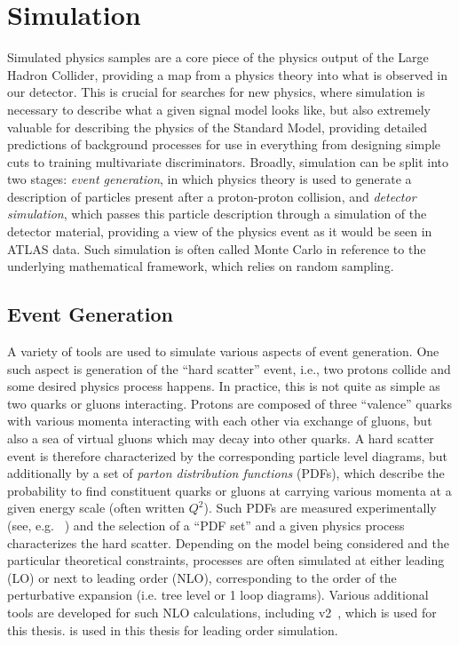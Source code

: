 \chapter{Simulation}
\label{chap:simulation}

Simulated physics samples are a core piece of the physics output of the Large Hadron Collider, 
providing a map from a physics theory into what is observed in our detector. This is crucial for 
searches for new physics, where simulation is necessary to describe what a given signal model looks 
like, but also extremely valuable for describing the physics of the Standard Model, providing detailed 
predictions of background processes for use in everything from designing simple cuts to training 
multivariate discriminators. Broadly, simulation can be split into two stages: \emph{event generation}, in which 
physics theory is used to generate a description of particles present after a proton-proton collision, and 
\emph{detector simulation}, which passes this particle description through a simulation of the detector 
material, providing a view of the physics event as it would be seen in ATLAS data. Such simulation 
is often called Monte Carlo in reference to the underlying mathematical framework, which relies on random 
sampling. 

\section{Event Generation}
A variety of tools are used to simulate various aspects of event generation. 
One such aspect is generation of the ``hard scatter'' event, i.e., two protons collide and 
some desired physics process happens. In practice, this is not quite as simple as two quarks or 
gluons interacting. Protons are composed of three ``valence'' quarks with various momenta interacting 
with each other via exchange of gluons, but also a sea of virtual gluons which may decay into other
quarks. A hard scatter event is therefore characterized by the corresponding particle level 
diagrams, but additionally by a set of \emph{parton distribution functions} (PDFs), which describe the 
probability to find constituent quarks or gluons at carrying various momenta at a given energy 
scale (often written $Q^2$). Such PDFs are measured experimentally (see, e.g. ~\cite{PDF}) and the selection 
of a ``PDF set'' and a given physics process characterizes the hard scatter. Depending on the model being 
considered and the particular theoretical constraints, processes are often simulated at either leading (LO) 
or next to leading order (NLO), corresponding to the order of the perturbative expansion (i.e. tree level 
or 1 loop diagrams). Various additional tools are developed for such NLO calculations, 
including \POWHEGBOX v2~\cite{Powheg1, Powheg2, Powheg3}, which is used for this thesis. \MADGRAPH\cite{MG5} is 
used in this thesis for leading order simulation.

